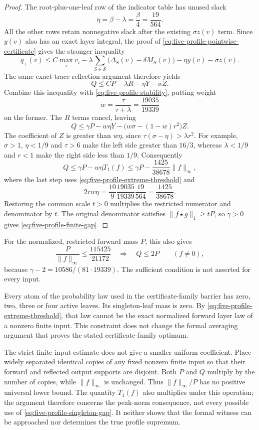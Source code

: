 \begin{proof}
The root-plus-one-leaf row of the indicator table has unused slack
\[
 \eta=\beta-\lambda=\frac{\beta}{4}=\frac{19}{564}.
\]
All the other rows retain nonnegative slack after the existing
$\sigma z(v)$ term.  Since $y(v)$ also has an exact layer integral,
the proof of \eqref{eq:five-profile-pointwise-certificate} gives
the stronger inequality
\[
 q_+(v)\le C\max_i v_i
  -\lambda\sum_{S\in\mathcal S}
       \bigl(\Delta_S(v)-\delta M_S(v)\bigr)
  -\eta y(v)-\sigma z(v).
\]
The same exact-trace reflection argument therefore yields
\[
 Q\le CP-\lambda R-\eta Y-\sigma Z.
\]
Combine this inequality with \eqref{eq:five-profile-stability},
putting weight
\[
 w=\frac{\tau}{\tau+\lambda}=\frac{19035}{19339}
\]
on the former.  The $R$ terms cancel, leaving
\[
 Q\le\gamma P-w\eta Y-
          \bigl(w\sigma-(1-w)r^2\bigr)Z.
\]
The coefficient of $Z$ is greater than $w\eta$, since
$\tau(\sigma-\eta)>\lambda r^2$.  For example, $\sigma>1$,
$\eta<1/9$ and $\tau>6$ make the left side greater than $16/3$,
whereas $\lambda<1/9$ and $r<1$ make the right side less than $1/9$.
Consequently
\begin{equation}\label{eq:five-profile-singleton-gap}
 Q\le\gamma P-w\eta T_1(f)
 \le\gamma P-\frac{1425}{38678}\|f\|_\infty,
\end{equation}
where the last step uses \eqref{eq:five-profile-extreme-threshold}
and
\[
 2rw\eta
 =\frac{10}{9}\frac{19035}{19339}\frac{19}{564}
 =\frac{1425}{38678}.
\]
Restoring the common scale $t>0$ multiplies the restricted numerator
and denominator by $t$.  The original denominator satisfies
$\|f\star g\|_1\ge tP$, so $\gamma>0$ gives
\eqref{eq:five-profile-finite-gap}.
\end{proof}

For the normalized, restricted forward mass $P$, this also gives
\[
 \frac{P}{\|f\|_\infty}\le\frac{115425}{21172}
 \quad\Longrightarrow\quad Q\le2P
 \qquad(f\ne0),
\]
because $\gamma-2=10586/(81\cdot19339)$.  The sufficient condition
is not asserted for every input.

Every atom of the probability law used in the certificate-family
barrier has zero, two, three or four active leaves.  Its
singleton-leaf mass is zero.  By
\eqref{eq:five-profile-extreme-threshold}, that law cannot be the
exact normalized forward layer law of a nonzero finite input.
This constraint does not change the formal averaging argument
that proves the stated certificate-family optimum.

The strict finite-input estimate does not give a smaller uniform
coefficient.  Place widely separated identical copies of any fixed
nonzero finite input so that their forward and reflected output
supports are disjoint.  Both $P$ and $Q$ multiply by the number
of copies, while $\|f\|_\infty$ is unchanged.  Thus
$\|f\|_\infty/P$ has no positive universal lower bound.
The quantity $T_1(f)$ also multiplies under this operation; the
argument therefore concerns the peak-norm consequence, not every
possible use of \eqref{eq:five-profile-singleton-gap}.
It neither shows that the formal witness can be approached nor
determines the true profile supremum.
